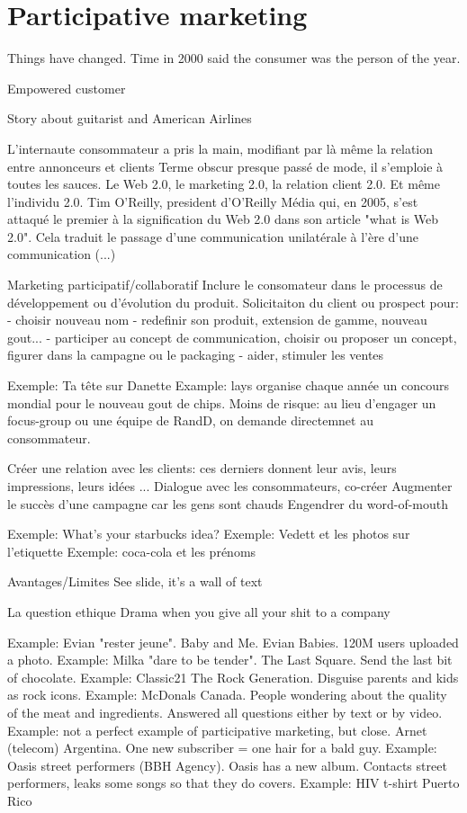 \vspace{-1.2cm}

\section{Participative marketing}

Things have changed. Time in 2000 said the consumer was the person of the year.

Empowered customer

Story about guitarist and American Airlines

L'internaute consommateur a pris la main, modifiant par là même la relation entre annonceurs et clients
Terme obscur presque passé de mode, il s'emploie à toutes les sauces. Le Web 2.0, le marketing 2.0, la relation client 2.0. Et même l'individu 2.0.
Tim O'Reilly, president d'O'Reilly Média qui, en 2005, s'est attaqué le premier à la signification du Web 2.0 dans son article
"what is Web 2.0". Cela traduit le passage d'une communication unilatérale à l'ère d'une communication (...)

Marketing participatif/collaboratif
    Inclure le consomateur dans le processus de développement ou d'évolution du produit.
    Solicitaiton du client ou prospect pour:
        - choisir nouveau nom
        - redefinir son produit, extension de gamme, nouveau gout...
        - participer au concept de communication, choisir ou proposer un concept, figurer dans la campagne ou le packaging
        - aider, stimuler les ventes

    Exemple: Ta tête sur Danette
    Example: lays organise chaque année un concours mondial pour le nouveau gout de chips. Moins de risque: au lieu d'engager un focus-group ou une équipe de RandD, on demande directemnet au consommateur.

    Créer une relation avec les clients: ces derniers donnent leur avis, leurs impressions, leurs idées ...
    Dialogue avec les consommateurs, co-créer
    Augmenter le succès d'une campagne car les gens sont chauds
    Engendrer du word-of-mouth

    Exemple: What's your starbucks idea?
    Exemple: Vedett et les photos sur l'etiquette
    Exemple: coca-cola et les prénoms

Avantages/Limites
    See slide, it's a wall of text

La question ethique
    Drama when you give all your shit to a company

Example: Evian "rester jeune". Baby and Me. Evian Babies. 120M users uploaded a photo.
Example: Milka "dare to be tender". The Last Square. Send the last bit of chocolate.
Example: Classic21 The Rock Generation. Disguise parents and kids as rock icons.
Example: McDonals Canada. People wondering about the quality of the meat and ingredients. Answered all questions either by text or by video.
Example: not a perfect example of participative marketing, but close. Arnet (telecom) Argentina. One new subscriber = one hair for a bald guy.
Example: Oasis street performers (BBH Agency). Oasis has a new album. Contacts street performers, leaks some songs so that they do covers.
Example: HIV t-shirt Puerto Rico

